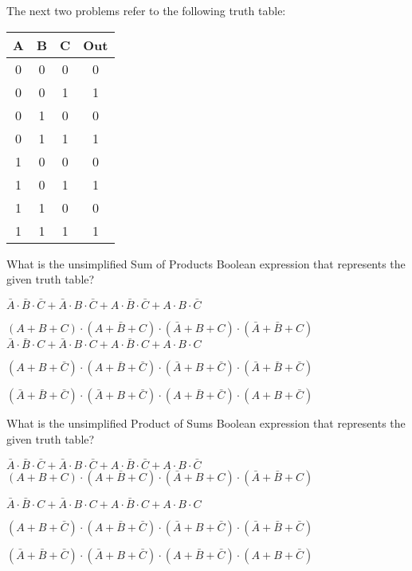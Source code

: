 \vspace{0.5cm}
The next two problems refer to the following truth table:
\begin{center}
	\begin{tabular}{|c c c || c|} 
		\hline
		A & B & C & Out \\
		\hline\hline
		0 & 0 & 0 & 0 \\ \hline
		0 & 0 & 1 & 1 \\\hline
		0 & 1 & 0 & 0 \\\hline
		0 & 1 & 1 & 1 \\\hline
		1 & 0 & 0 & 0 \\\hline
		1 & 0 & 1 & 1 \\\hline
		1 & 1 & 0 & 0 \\\hline
		1 & 1 & 1 & 1 \\\hline
	\end{tabular}
\end{center}
\vspace{0.5cm}

\begin{problem}{4}
	What is the unsimplified Sum of Products Boolean expression that represents the given truth table?
	\begin{mchoice}
		\item $\bar{A}\cdot\bar{B}\cdot\bar{C} + \bar{A}\cdot B\cdot\bar{C} + A\cdot \bar{B}\cdot \bar{C} + A\cdot B\cdot\bar{C}$ 
		\item $(A+ B+ C) \cdot (A+ \bar{B}+C) \cdot (\bar{A}+ B+ C) \cdot (\bar{A}+\bar{B}+ C)$ 
		\xtem $ \bar{A}\cdot \bar{B}\cdot C +\bar{A}\cdot B\cdot C + A\cdot \bar{B}\cdot C + A\cdot B\cdot C$ 
	        \item $(A+ B+ \bar{C}) \cdot (A+ \bar{B}+\bar{C}) \cdot (\bar{A}+ B+ \bar{C}) \cdot (\bar{A}+ \bar{B}+ \bar{C})$
		\item $(\bar{A}+ \bar{B}+ \bar{C}) \cdot (\bar{A}+ B+\bar{C}) \cdot (A+ \bar{B}+ \bar{C}) \cdot (A+B+\bar{C})$ 
	\end{mchoice}
\end{problem}

\begin{problem}{4}
	What is the unsimplified Product of Sums Boolean expression that represents the given truth table?
	\begin{mchoice}
		\item $\bar{A}\cdot\bar{B}\cdot\bar{C} + \bar{A}\cdot B\cdot\bar{C} + A\cdot \bar{B}\cdot \bar{C} + A\cdot B\cdot\bar{C}$ 
		\xtem $(A+ B+ C) \cdot (A+ \bar{B}+C) \cdot (\bar{A}+ B+ C) \cdot (\bar{A}+\bar{B}+ C)$ 
		\item $ \bar{A}\cdot \bar{B}\cdot C +\bar{A}\cdot B\cdot C + A\cdot \bar{B}\cdot C + A\cdot B\cdot C$ 
		\item $(A+ B+ \bar{C}) \cdot (A+ \bar{B}+\bar{C}) \cdot (\bar{A}+ B+ \bar{C}) \cdot (\bar{A}+ \bar{B}+ \bar{C})$
		\item $(\bar{A}+ \bar{B}+ \bar{C}) \cdot (\bar{A}+ B+\bar{C}) \cdot (A+ \bar{B}+ \bar{C}) \cdot (A+B+\bar{C})$
	\end{mchoice}
\end{problem}